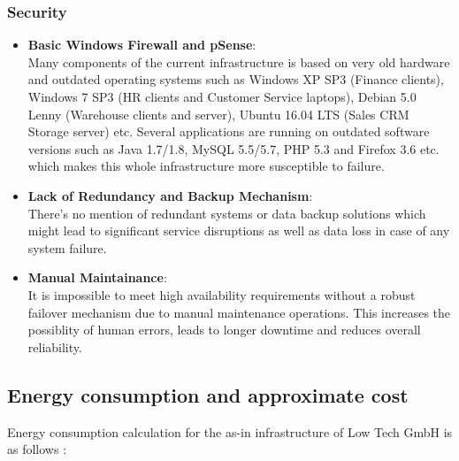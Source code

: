 \documentclass{llncs}
\begin{document}
\subsubsection*{Security}
\begin{itemize}
  \item \textbf{Basic Windows Firewall and pSense}: 
  \\
  Many components of the current infrastructure is based on very old hardware and outdated operating systems such as 
  Windows XP SP3 (Finance clients), Windows 7 SP3 (HR clients and Customer Service laptops), Debian 5.0 Lenny (Warehouse clients and server),
  Ubuntu 16.04 LTS (Sales CRM Storage server) etc. Several applications are running on outdated software versions such as Java 1.7/1.8, 
  MySQL 5.5/5.7, PHP 5.3 and Firefox 3.6 etc. which makes this whole infrastructure more susceptible to failure.
  \\
  \item \textbf{Lack of Redundancy and Backup Mechanism}:
  \\ 
  There's no mention of redundant systems or data backup solutions which might lead to significant service disruptions as well as data loss in case of any system failure.
  \\
  \item \textbf{Manual Maintainance}: 
  \\It is impossible to meet high availability requirements without a robust failover mechanism due to manual maintenance operations. 
  This increases the possiblity of human errors, leads to longer downtime and reduces overall reliability.
  \\
\end{itemize}
\subsection{Energy consumption and approximate cost}

Energy consumption calculation for the as-in infrastructure of Low Tech GmbH is as follows : 
\end{document}
